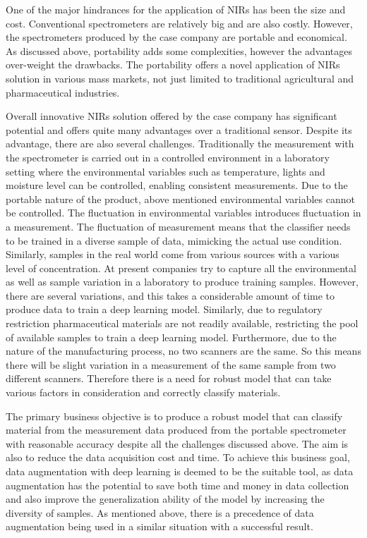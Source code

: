 One of the major hindrances for the application of NIRs has been the size and cost. Conventional spectrometers are relatively big and are also costly. However, the spectrometers produced by the case company are portable and economical. As discussed above, portability adds some complexities, however the advantages over-weight the drawbacks. The portability offers a novel application of NIRs solution in various mass markets, not just limited to traditional agricultural and pharmaceutical industries. 

Overall innovative NIRs solution offered by the case company has significant potential and offers quite many advantages over a traditional sensor. Despite its advantage, there are also several challenges. Traditionally the measurement with the spectrometer is carried out in a controlled environment in a laboratory setting where the environmental variables such as temperature, lights and moisture level can be controlled, enabling consistent measurements. Due to the portable nature of the product, above mentioned environmental variables cannot be controlled. The fluctuation in environmental variables introduces fluctuation in a measurement. The fluctuation of measurement means that the classifier needs to be trained in a diverse sample of data, mimicking the actual use condition. Similarly, samples in the real world come from various sources with a various level of concentration. At present companies try to capture all the environmental as well as sample variation in a laboratory to produce training samples. However, there are several variations, and this takes a considerable amount of time to produce data to train a deep learning model. Similarly, due to regulatory restriction pharmaceutical materials are not readily available, restricting the pool of available samples to train a deep learning model. Furthermore, due to the nature of the manufacturing process, no two scanners are the same. So this means there will be slight variation in a measurement of the same sample from two different scanners. Therefore there is a need for robust model that can take various factors in consideration and correctly classify materials. 

The primary business objective is to produce a robust model that can classify material from the measurement data produced from the portable spectrometer with reasonable accuracy despite all the challenges discussed above. The aim is also to reduce the data acquisition cost and time. To achieve this business goal, data augmentation with deep learning is deemed to be the suitable tool, as data augmentation has the potential to save both time and money in data collection and also improve the generalization ability of the model by increasing the diversity of samples. As mentioned above, there is a precedence of data augmentation being used in a similar situation with a successful result.  

